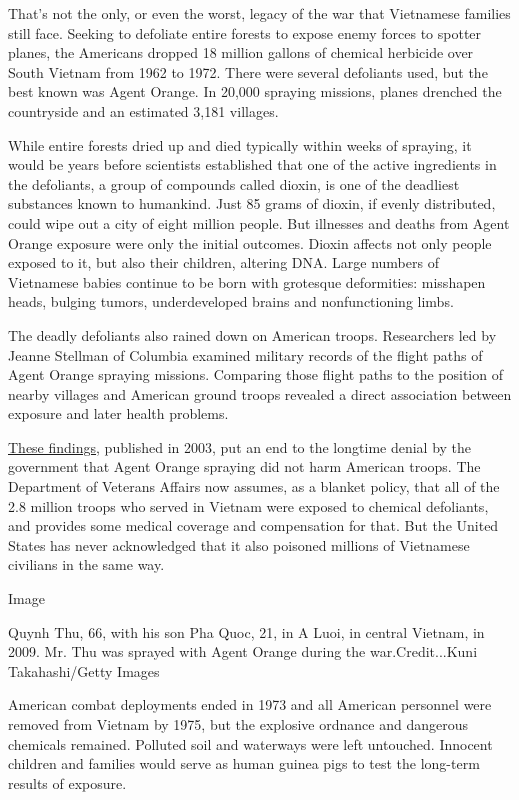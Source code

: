That's not the only, or even the worst, legacy of the war that
Vietnamese families still face. Seeking to defoliate entire forests to
expose enemy forces to spotter planes, the Americans dropped 18 million
gallons of chemical herbicide over South Vietnam from 1962 to 1972.
There were several defoliants used, but the best known was Agent Orange.
In 20,000 spraying missions, planes drenched the countryside and an
estimated 3,181 villages.

While entire forests dried up and died typically within weeks of
spraying, it would be years before scientists established that one of
the active ingredients in the defoliants, a group of compounds called
dioxin, is one of the deadliest substances known to humankind. Just 85
grams of dioxin, if evenly distributed, could wipe out a city of eight
million people. But illnesses and deaths from Agent Orange exposure were
only the initial outcomes. Dioxin affects not only people exposed to it,
but also their children, altering DNA. Large numbers of Vietnamese
babies continue to be born with grotesque deformities: misshapen heads,
bulging tumors, underdeveloped brains and nonfunctioning limbs.

The deadly defoliants also rained down on American troops. Researchers
led by Jeanne Stellman of Columbia examined military records of the
flight paths of Agent Orange spraying missions. Comparing those flight
paths to the position of nearby villages and American ground troops
revealed a direct association between exposure and later health
problems.

\href{http://www.columbia.edu/~jms13/articles.html}{These findings},
published in 2003, put an end to the longtime denial by the government
that Agent Orange spraying did not harm American troops. The Department
of Veterans Affairs now assumes, as a blanket policy, that all of the
2.8 million troops who served in Vietnam were exposed to chemical
defoliants, and provides some medical coverage and compensation for
that. But the United States has never acknowledged that it also poisoned
millions of Vietnamese civilians in the same way.

Image

Quynh Thu, 66, with his son Pha Quoc, 21, in A Luoi, in central Vietnam,
in 2009. Mr. Thu was sprayed with Agent Orange during the
war.Credit...Kuni Takahashi/Getty Images

American combat deployments ended in 1973 and all American personnel
were removed from Vietnam by 1975, but the explosive ordnance and
dangerous chemicals remained. Polluted soil and waterways were left
untouched. Innocent children and families would serve as human guinea
pigs to test the long-term results of exposure.

